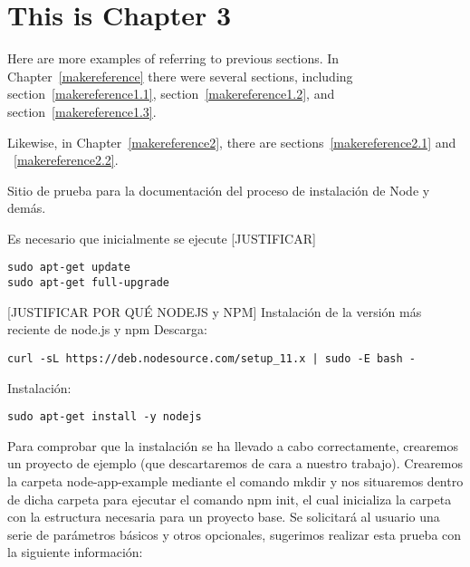 
\cleardoublepage


\chapter{This is Chapter 3}
\label{makereference3}

Here are more examples of referring to previous sections.  In
Chapter~\ref{makereference} there were several sections, including
section~\ref{makereference1.1}, section~\ref{makereference1.2},
and section~\ref{makereference1.3}.

Likewise, in Chapter~\ref{makereference2}, there are
sections~\ref{makereference2.1} and ~\ref{makereference2.2}.

Sitio de prueba para la documentación del proceso de instalación de Node y demás.

Es necesario que inicialmente se ejecute [JUSTIFICAR]
\begin{verbatim}
sudo apt-get update
sudo apt-get full-upgrade
\end{verbatim}

[JUSTIFICAR POR QUÉ NODEJS y NPM]
Instalación de la versión más reciente de node.js y npm
Descarga:
\begin{verbatim}
curl -sL https://deb.nodesource.com/setup_11.x | sudo -E bash -
\end{verbatim}
Instalación:
\begin{verbatim}
sudo apt-get install -y nodejs
\end{verbatim}
Para comprobar que la instalación se ha llevado a cabo correctamente, crearemos un proyecto de ejemplo (que descartaremos de cara a nuestro trabajo).
Crearemos la carpeta node-app-example mediante el comando mkdir y nos situaremos dentro de dicha carpeta para ejecutar el comando npm init, el cual inicializa la carpeta con la estructura necesaria para un proyecto base. Se solicitará al usuario una serie de parámetros básicos y otros opcionales, sugerimos realizar esta prueba con la siguiente información:

